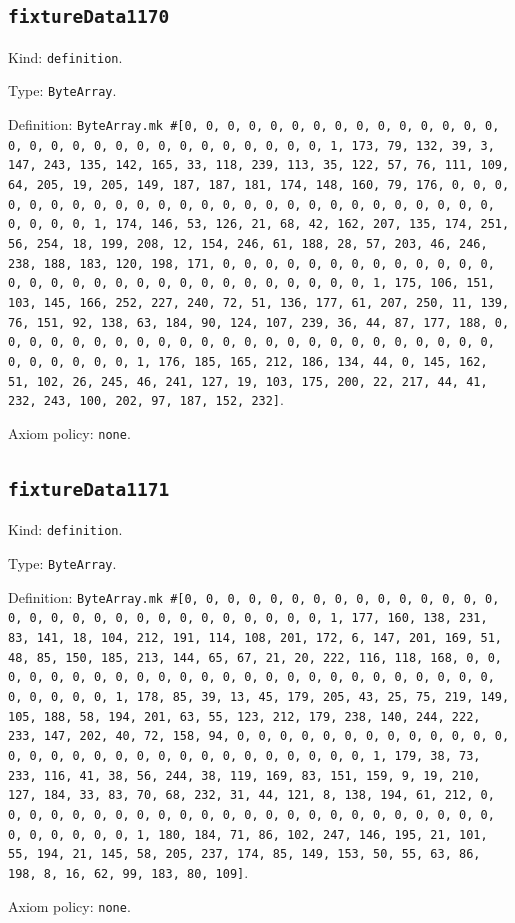 \documentclass[11pt]{article}
\begin{document}
\subsection*{\texttt{fixtureData1170}}
\noindent Kind: \texttt{definition}.\par
\noindent Type: \texttt{ByteArray}.\par
\noindent Definition: \texttt{ByteArray.mk \#[0, 0, 0, 0, 0, 0, 0, 0, 0, 0, 0, 0, 0, 0, 0, 0, 0, 0, 0, 0, 0, 0, 0, 0, 0, 0, 0, 0, 0, 0, 1, 173, 79, 132, 39, 3, 147, 243, 135, 142, 165, 33, 118, 239, 113, 35, 122, 57, 76, 111, 109, 64, 205, 19, 205, 149, 187, 187, 181, 174, 148, 160, 79, 176, 0, 0, 0, 0, 0, 0, 0, 0, 0, 0, 0, 0, 0, 0, 0, 0, 0, 0, 0, 0, 0, 0, 0, 0, 0, 0, 0, 0, 0, 0, 1, 174, 146, 53, 126, 21, 68, 42, 162, 207, 135, 174, 251, 56, 254, 18, 199, 208, 12, 154, 246, 61, 188, 28, 57, 203, 46, 246, 238, 188, 183, 120, 198, 171, 0, 0, 0, 0, 0, 0, 0, 0, 0, 0, 0, 0, 0, 0, 0, 0, 0, 0, 0, 0, 0, 0, 0, 0, 0, 0, 0, 0, 0, 0, 1, 175, 106, 151, 103, 145, 166, 252, 227, 240, 72, 51, 136, 177, 61, 207, 250, 11, 139, 76, 151, 92, 138, 63, 184, 90, 124, 107, 239, 36, 44, 87, 177, 188, 0, 0, 0, 0, 0, 0, 0, 0, 0, 0, 0, 0, 0, 0, 0, 0, 0, 0, 0, 0, 0, 0, 0, 0, 0, 0, 0, 0, 0, 0, 1, 176, 185, 165, 212, 186, 134, 44, 0, 145, 162, 51, 102, 26, 245, 46, 241, 127, 19, 103, 175, 200, 22, 217, 44, 41, 232, 243, 100, 202, 97, 187, 152, 232]}.\par
\noindent Axiom policy: \texttt{none}.\par
\subsection*{\texttt{fixtureData1171}}
\noindent Kind: \texttt{definition}.\par
\noindent Type: \texttt{ByteArray}.\par
\noindent Definition: \texttt{ByteArray.mk \#[0, 0, 0, 0, 0, 0, 0, 0, 0, 0, 0, 0, 0, 0, 0, 0, 0, 0, 0, 0, 0, 0, 0, 0, 0, 0, 0, 0, 0, 0, 1, 177, 160, 138, 231, 83, 141, 18, 104, 212, 191, 114, 108, 201, 172, 6, 147, 201, 169, 51, 48, 85, 150, 185, 213, 144, 65, 67, 21, 20, 222, 116, 118, 168, 0, 0, 0, 0, 0, 0, 0, 0, 0, 0, 0, 0, 0, 0, 0, 0, 0, 0, 0, 0, 0, 0, 0, 0, 0, 0, 0, 0, 0, 0, 1, 178, 85, 39, 13, 45, 179, 205, 43, 25, 75, 219, 149, 105, 188, 58, 194, 201, 63, 55, 123, 212, 179, 238, 140, 244, 222, 233, 147, 202, 40, 72, 158, 94, 0, 0, 0, 0, 0, 0, 0, 0, 0, 0, 0, 0, 0, 0, 0, 0, 0, 0, 0, 0, 0, 0, 0, 0, 0, 0, 0, 0, 0, 0, 1, 179, 38, 73, 233, 116, 41, 38, 56, 244, 38, 119, 169, 83, 151, 159, 9, 19, 210, 127, 184, 33, 83, 70, 68, 232, 31, 44, 121, 8, 138, 194, 61, 212, 0, 0, 0, 0, 0, 0, 0, 0, 0, 0, 0, 0, 0, 0, 0, 0, 0, 0, 0, 0, 0, 0, 0, 0, 0, 0, 0, 0, 0, 0, 1, 180, 184, 71, 86, 102, 247, 146, 195, 21, 101, 55, 194, 21, 145, 58, 205, 237, 174, 85, 149, 153, 50, 55, 63, 86, 198, 8, 16, 62, 99, 183, 80, 109]}.\par
\noindent Axiom policy: \texttt{none}.\par
\end{document}
